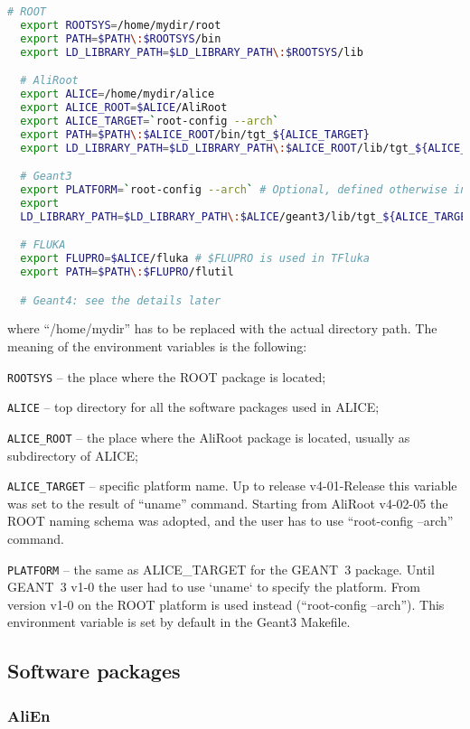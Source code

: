 \documentclass[12pt,a4paper,twoside]{article}
\begin{document}
\begin{lstlisting}[language=sh]
  # ROOT
  export ROOTSYS=/home/mydir/root
  export PATH=$PATH\:$ROOTSYS/bin
  export LD_LIBRARY_PATH=$LD_LIBRARY_PATH\:$ROOTSYS/lib

  # AliRoot
  export ALICE=/home/mydir/alice
  export ALICE_ROOT=$ALICE/AliRoot
  export ALICE_TARGET=`root-config --arch`
  export PATH=$PATH\:$ALICE_ROOT/bin/tgt_${ALICE_TARGET}
  export LD_LIBRARY_PATH=$LD_LIBRARY_PATH\:$ALICE_ROOT/lib/tgt_${ALICE_TARGET}

  # Geant3
  export PLATFORM=`root-config --arch` # Optional, defined otherwise in Geant3 Makefile
  export
  LD_LIBRARY_PATH=$LD_LIBRARY_PATH\:$ALICE/geant3/lib/tgt_${ALICE_TARGET}

  # FLUKA
  export FLUPRO=$ALICE/fluka # $FLUPRO is used in TFluka
  export PATH=$PATH\:$FLUPRO/flutil

  # Geant4: see the details later
\end{lstlisting}

where ``/home/mydir'' has to be replaced with the actual directory
path. The meaning of the environment variables is the following:

\texttt{ROOTSYS} -- the place where the ROOT package is located;

\texttt{ALICE} -- top directory for all the software packages used in ALICE;

\texttt{ALICE\_ROOT} -- the place where the AliRoot package is located, usually
as subdirectory of ALICE;

\texttt{ALICE\_TARGET} -- specific platform name. Up to release
v4-01-Release this variable was set to the result of ``uname''
command. Starting from AliRoot v4-02-05 the ROOT naming schema was
adopted, and the user has to use ``root-config --arch'' command.

\texttt{PLATFORM} -- the same as ALICE\_TARGET for the GEANT~3
package. Until GEANT~3 v1-0 the user had to use `uname` to specify the
platform. From version v1-0 on the ROOT platform is used instead
(``root-config --arch''). This environment variable is set by default
in the Geant3 Makefile.



\subsection{Software packages}

\subsubsection{AliEn}
\end{document}
